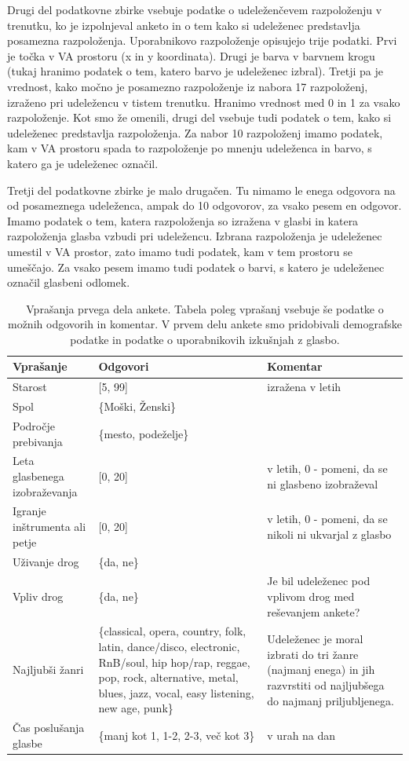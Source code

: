 \documentclass[a4paper, 12pt]{book}
\begin{document}
{Drugi del podatkovne zbirke vsebuje podatke o udeleženčevem razpoloženju v trenutku, ko je izpolnjeval anketo in o tem kako si udeleženec predstavlja posamezna razpoloženja. Uporabnikovo razpoloženje opisujejo trije podatki. Prvi je točka v VA prostoru (x in y koordinata). Drugi je barva v barvnem krogu (tukaj hranimo podatek o tem, katero barvo je  udeleženec izbral). Tretji pa je vrednost, kako močno je posamezno razpoloženje iz nabora 17 razpoloženj, izraženo pri udeležencu v tistem trenutku. Hranimo vrednost med 0 in 1 za vsako razpoloženje. Kot smo že omenili, drugi del vsebuje tudi podatek o tem, kako si udeleženec predstavlja razpoloženja. Za nabor 10 razpoloženj imamo podatek, kam v VA prostoru spada to razpoloženje po mnenju udeleženca in barvo, s katero ga je udeleženec označil. 

Tretji del podatkovne zbirke je malo drugačen. Tu nimamo le enega odgovora na od posameznega udeleženca, ampak do 10 odgovorov, za vsako pesem en odgovor. Imamo podatek o tem, katera razpoloženja so izražena v glasbi in katera razpoloženja glasba vzbudi pri udeležencu. Izbrana razpoloženja je udeleženec umestil v VA prostor, zato imamo tudi podatek, kam v tem prostoru se umeščajo.  Za vsako pesem imamo tudi podatek o barvi, s katero je udeleženec označil glasbeni odlomek.  

\newpage

\begin{table}[H]
\begin{center}
\caption{Vprašanja prvega dela ankete. Tabela poleg vprašanj vsebuje še podatke o možnih odgovorih in komentar. V prvem delu ankete smo pridobivali demografske podatke in podatke o uporabnikovih izkušnjah z glasbo.}
\begin{tabular}{| p{3.5cm} | p{4.5cm} | p{4.5cm} |}
\hline
Vprašanje & Odgovori & Komentar \\ \hline \hline
Starost & [5, 99] & izražena v letih \\ \hline
Spol & \{Moški, Ženski\} & \\ \hline
Področje prebivanja & \{mesto, podeželje\} & \\ \hline
Leta glasbenega izobraževanja & [0, 20] & v letih, 0 - pomeni, da se ni glasbeno izobraževal \\ \hline
Igranje inštrumenta ali petje & [0, 20] & v letih, 0 - pomeni, da se nikoli ni ukvarjal z glasbo \\ \hline
Uživanje drog & \{da, ne\} & \\ \hline
Vpliv drog & \{da, ne\} &  Je bil udeleženec pod vplivom drog med reševanjem ankete? \\ \hline
Najljubši žanri & \{classical, opera, country, folk, latin, dance/disco, electronic, RnB/soul, hip hop/rap, reggae, pop, rock, alternative, metal, blues, jazz, vocal, easy listening, new age, punk\} & Udeleženec je moral izbrati do tri žanre (najmanj enega) in jih razvrstiti od najljubšega do najmanj priljubljenega. \\ \hline
Čas poslušanja glasbe & \{manj kot 1, 1-2, 2-3, več kot 3\} & v urah na dan \\ \hline


\end{tabular}
\end{center}
\end{table}}
\end{document}
